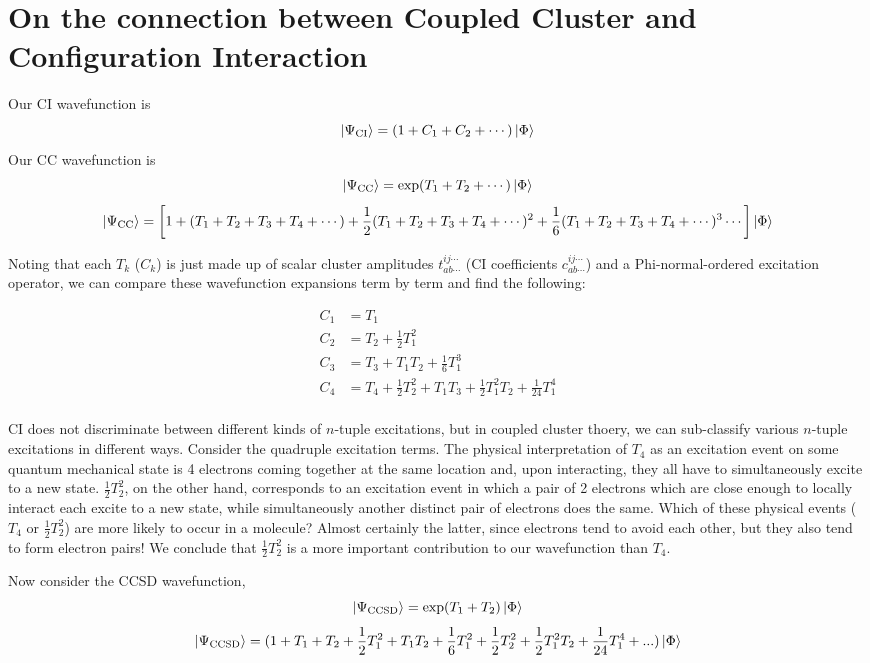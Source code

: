 \documentclass{article}
\begin{document}
\section{On the connection between Coupled Cluster and Configuration Interaction}
Our CI wavefunction is  
\[ \ket{\Psi_{\mathrm{CI}}} = (1  + C_1 + C_2 + \cdots) \ket{\Phi}  \]
Our CC wavefunction is 
\[ \ket{\Psi_{\mathrm{CC}}} = \exp(T_1 + T_2 + \cdots) \ket{\Phi}  \]
\[ \ket{\Psi_{\mathrm{CC}}} = \left[ 1 + (T_1 + T_2 + T_3 + T_4 + \cdots ) + \frac{1}{2} (T_1 + T_2 + T_3 + T_4 + \cdots)^2 +  \frac{1}{6} (T_1 + T_2 + T_3 + T_4 + \cdots)^3 \cdots \right] \ket{\Phi}  \]

Noting that each $T_k$ ($C_k$) is just made up of scalar cluster amplitudes 
$t_{ab \cdots}^{ij \cdots}$ (CI coefficients $c_{ab \cdots}^{ij \cdots}$) 
and a Phi-normal-ordered excitation operator,  we can compare these wavefunction 
expansions term by term and find the following:

\begin{align*}
C_1 &= T_1 \\
C_2 &= T_2 + \frac{1}{2} T_1^2 \\
C_3 &= T_3 + T_1 T_2 + \frac{1}{6} T_1^3 \\
C_4 &= T_4 + \frac{1}{2}T_2^2 + T_1 T_3 +  \frac{1}{2} T_1^2 T_2 + \frac{1}{24} T_1^4 \\
\end{align*}

CI does not discriminate between different kinds of $n$-tuple excitations,
but in coupled cluster thoery, we can sub-classify various $n$-tuple excitations 
in different ways. 
Consider the quadruple excitation terms.
The physical interpretation of $T_4$ as an excitation event on some 
quantum mechanical state is 4 electrons coming together at the same location
and, upon interacting, they all have to simultaneously excite to a new state.
$\frac{1}{2}T_2^2$, on the other hand, corresponds to an excitation event 
in which a pair of 2 electrons which are close enough to locally interact
each excite to a new state, while simultaneously another distinct pair of 
    electrons does the same.
Which of these physical events ($T_4$  or $\frac{1}{2}T_2^2$) are more likely 
    to occur in a molecule? 
Almost certainly the latter, since electrons tend to avoid each other, but they also
    tend to form electron pairs! 
We conclude that $\frac{1}{2}T_2^2$ is a more important contribution to our wavefunction
than $T_4$.

Now consider the CCSD wavefunction,
\[ \ket{\Psi_{\mathrm{CCSD}}} = \exp(T_1 + T_2) \ket{\Phi} \] 
\[ \ket{\Psi_{\mathrm{CCSD}}} = (1 + T_1 + T_2 + \frac{1}{2} T_1^2 + T_1 T_2 + 
 \frac{1}{6} T_1^2 + \frac{1}{2} T_2^2 + \frac{1}{2} T_1^2 T_2 + \frac{1}{24} T_1^4 + ...)    \ket{\Phi} \] 
\end{document}
